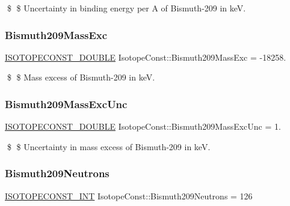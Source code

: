 \$ \$ Uncertainty in binding energy per A of Bismuth-\/209 in keV. \mbox{\label{group___isotope_const-_bismuth-_bi209_ga00a2cfb450e471ce6f220e419a29e735}} 
\subsubsection{\texorpdfstring{Bismuth209\+Mass\+Exc}{Bismuth209MassExc}}
{\footnotesize\ttfamily \mbox{\hyperlink{group___isotope_const-_macros_ga8f45a7272ce02c0b4c65c44636ed719a}{I\+S\+O\+T\+O\+P\+E\+C\+O\+N\+S\+T\+\_\+\+D\+O\+U\+B\+LE}} Isotope\+Const\+::\+Bismuth209\+Mass\+Exc = -\/18258.}

\$ \$ Mass excess of Bismuth-\/209 in keV. \mbox{\label{group___isotope_const-_bismuth-_bi209_ga74f3691c0b5cfb9594aba62089c5817d}} 
\subsubsection{\texorpdfstring{Bismuth209\+Mass\+Exc\+Unc}{Bismuth209MassExcUnc}}
{\footnotesize\ttfamily \mbox{\hyperlink{group___isotope_const-_macros_ga8f45a7272ce02c0b4c65c44636ed719a}{I\+S\+O\+T\+O\+P\+E\+C\+O\+N\+S\+T\+\_\+\+D\+O\+U\+B\+LE}} Isotope\+Const\+::\+Bismuth209\+Mass\+Exc\+Unc = 1.}

\$ \$ Uncertainty in mass excess of Bismuth-\/209 in keV. \mbox{\label{group___isotope_const-_bismuth-_bi209_ga7ab7833f92d56d78d373b46cbe53867e}} 
\subsubsection{\texorpdfstring{Bismuth209\+Neutrons}{Bismuth209Neutrons}}
{\footnotesize\ttfamily \mbox{\hyperlink{group___isotope_const-_macros_ga5f18360b3e99483a35c32d789e62621c}{I\+S\+O\+T\+O\+P\+E\+C\+O\+N\+S\+T\+\_\+\+I\+NT}} Isotope\+Const\+::\+Bismuth209\+Neutrons = 126}

